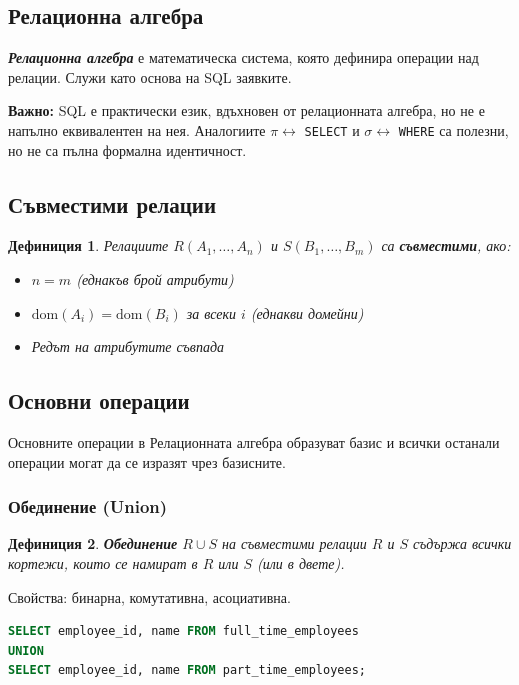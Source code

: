 \documentclass{scrartcl}
\newtheorem{definition}{Дефиниция}
\begin{document}
\begin{FlushLeft}
\section{Релационна алгебра}

\textbf{\textit{Релационна алгебра}} е математическа система, която дефинира операции над релации. Служи като основа на SQL заявките.

\textbf{Важно:} SQL е практически език, вдъхновен от релационната алгебра, но не е напълно еквивалентен на нея. Аналогиите $\pi \leftrightarrow$ \texttt{SELECT} и $\sigma \leftrightarrow$ \texttt{WHERE} са полезни, но не са пълна формална идентичност.

\subsection{Съвместими релации}

\begin{definition}
Релациите $R(A_1, \ldots, A_n)$ и $S(B_1, \ldots, B_m)$ са \textbf{\textit{съвместими}}, ако:
\begin{itemize}
    \item $n = m$ (еднакъв брой атрибути)
    \item $\text{dom}(A_i) = \text{dom}(B_i)$ за всеки $i$ (еднакви домейни)
    \item Редът на атрибутите съвпада
\end{itemize}
\end{definition}

\subsection{Основни операции}

Основните операции в Релационната алгебра образуват базис и всички останали операции могат да се изразят чрез базисните.

\subsubsection{Обединение (Union)}

\begin{definition}
\textbf{\textit{Обединение}} $R \cup S$ на съвместими релации $R$ и $S$ съдържа всички кортежи, които се намират в $R$ или $S$ (или в двете).
\end{definition}

Свойства: бинарна, комутативна, асоциативна.

\begin{lstlisting}[language=SQL, caption=UNION]
SELECT employee_id, name FROM full_time_employees
UNION
SELECT employee_id, name FROM part_time_employees;
\end{lstlisting}


\end{FlushLeft}
\end{document}
